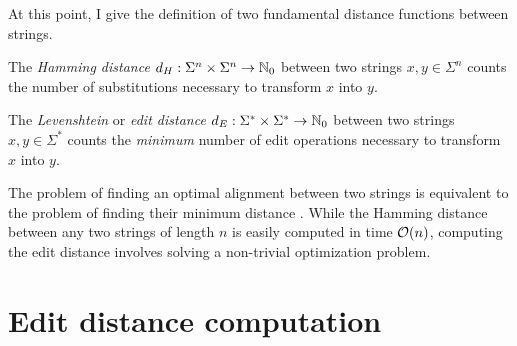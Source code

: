 At this point, I give the definition of two fundamental distance functions between strings.

\begin{definition}
\label{def:hamming}
\citep{Hamming1950} The \emph{Hamming distance} $d_H : \Sigma^{n} \times \Sigma^{n} \rightarrow \mathbb {N}_0$ between two strings $x,y \in \Sigma^{n}$ counts the number of substitutions necessary to transform $x$ into $y$.
\end{definition}

\begin{definition}
\label{def:edit}
\citep{Levenshtein1966} The \emph{Levenshtein} or \emph{edit distance} $d_E : \Sigma^{*} \times \Sigma^{*} \rightarrow \mathbb {N}_0$ between two strings $x,y \in \Sigma^{*}$ counts the \emph{minimum} number of edit operations necessary to transform $x$ into $y$.
\end{definition}

The problem of finding an optimal alignment between two strings is equivalent to the problem of finding their minimum distance \citep{Gusfield1997}.
While the Hamming distance between any two strings of length $n$ is easily computed in time $\mathcal{O}(n)$, computing the edit distance involves solving a non-trivial optimization problem.

\section{Edit distance computation}

